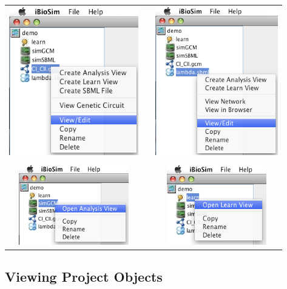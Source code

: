 \documentclass[titlepage,11pt]{article}
\begin{document}
\begin{center}
\begin{tabular}{ccc}
\includegraphics[height=65mm]{screenshots/modGCM} & &
\includegraphics[height=65mm]{screenshots/modSBML} \\ \\
\includegraphics[height=35mm]{screenshots/modAnalysis} & &
\includegraphics[height=35mm]{screenshots/modLearn}
\end{tabular}
\end{center}

\subsection{Viewing Project Objects}
\end{document}
